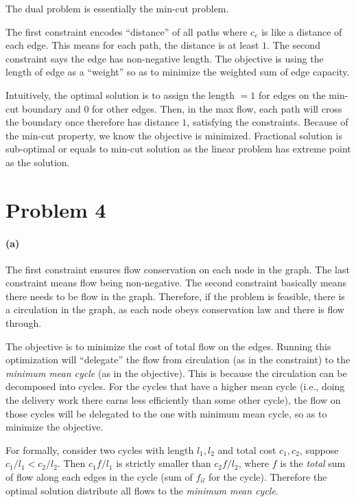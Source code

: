 \documentclass[12pt]{article}
\begin{document}
The dual problem is essentially the min-cut problem. 

The first constraint encodes ``distance'' of all paths where $c_e$ is like a distance of each edge. This means for each path, the distance is at least $1$. The second constraint says the edge has non-negative length. The objective is using the length of edge as a ``weight'' so as to minimize the weighted sum of edge capacity. 

Intuitively, the optimal solution is to assign the length $=1$ for edges on the min-cut boundary and $0$ for other edges. Then, in the max flow, each path will cross the boundary once therefore has distance $1$, satisfying the constraints. Because of the min-cut property, we know the objective is minimized. Fractional solution is sub-optimal or equals to min-cut solution as the linear problem has extreme point as the solution. 

\newpage

\section*{Problem 4}
\paragraph{(a)} The first constraint ensures flow conservation on each node in the graph. The last constraint means flow being non-negative. The second constraint basically means there needs to be flow in the graph. Therefore, if the problem is feasible, there is a circulation in the graph, as each node obeys conservation law and there is flow through. 

The objective is to minimize the cost of total flow on the edges. Running this optimization will ``delegate'' the flow from circulation (as in the constraint) to the \emph{minimum mean cycle} (as in the objective). This is because the circulation can be decomposed into cycles. For the cycles that have a higher mean cycle (i.e., doing the delivery work there earns less efficiently than some other cycle), the flow on those cycles will be delegated to the one with minimum mean cycle, so as to minimize the objective. 

For formally, consider two cycles with length $l_1, l_2$ and total cost $c_1, c_2$, suppose $c_1/l_1 < c_2/l_2$. Then $c_1f/l_1 $ is strictly smaller than $c_2f/l_2$, where $f$ is the \emph{total} sum of flow along each edges in the cycle (sum of $f_{il}$ for the cycle). Therefore the optimal solution distribute all flows to the \emph{minimum mean cycle}.
\end{document}
